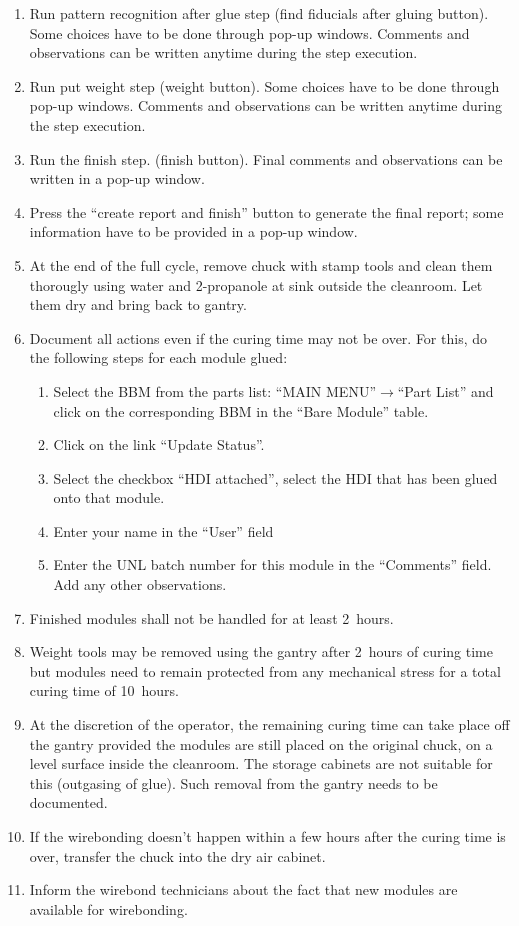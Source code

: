 \documentclass[12pt]{unlsilabsop}
\begin{document}
\begin{enumerate}
    \item Run pattern recognition after glue step (find fiducials after gluing button). Some choices have to be done through pop-up windows. Comments and observations can be written anytime during the step execution.
    \item Run put weight step (weight button). Some choices have to be done through pop-up windows. Comments and observations can be written anytime during the step execution.
    \item Run the finish step. (finish button). Final comments and observations can be written in a pop-up window.
    \item Press the ``create report and finish'' button to generate the final report; some information have to be provided in a pop-up window.
    \item At the end of the full cycle, remove chuck with stamp tools and clean them thorougly using water and 2-propanole at sink outside the cleanroom. Let them dry and bring back to gantry.
    \item Document all actions even if the curing time may not be over. For this, do the following steps for each module glued:
    \begin{enumerate}
        \item Select the BBM from the parts list: ``MAIN MENU''$\rightarrow$``Part List'' and click on the corresponding BBM in the ``Bare Module'' table.
        \item Click on the link ``Update Status''.
        \item Select the checkbox ``HDI attached'', select the HDI that has been glued onto that module.
        \item Enter your name in the ``User'' field
        \item Enter the UNL batch number for this module in the ``Comments'' field. Add any other observations.
    \end{enumerate}
    \item Finished modules shall not be handled for at least 2~hours.
    \item Weight tools may be removed using the gantry after 2~hours of curing time but modules need to remain protected from any mechanical stress for a total curing time of 10~hours.
    \item At the discretion of the operator, the remaining curing time can take place off the gantry provided the modules are still placed on the original chuck, on a level surface inside the cleanroom. The storage cabinets are not suitable for this (outgasing of glue). Such removal from the gantry needs to be documented.
    \item If the wirebonding doesn't happen within a few hours after the curing time is over, transfer the chuck into the dry air cabinet.
    \item Inform the wirebond technicians about the fact that new modules are available for wirebonding.
\end{enumerate}
\end{document}
